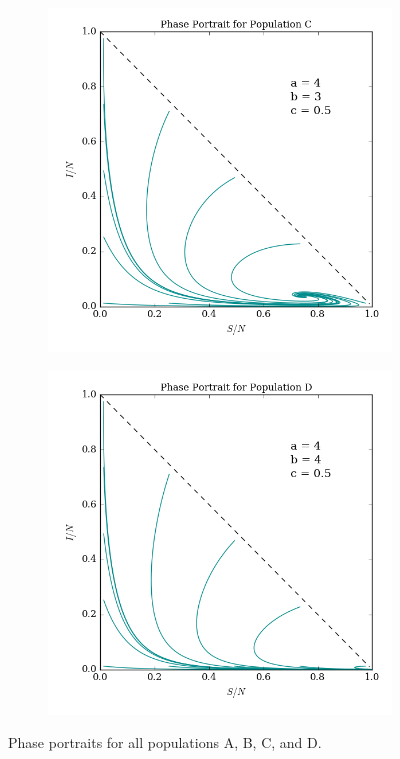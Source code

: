 \documentclass[prb,aps,twocolumn,showpacs,10pt]{revtex4-1}
\begin{document}
\begin{figure}
\medskip
\centering
\begin{subfigure}{.5\textwidth}
  \centering
  \includegraphics[width=\linewidth]{phaseportrait_C.png}
  \label{fig:sub1}
\end{subfigure}%
\begin{subfigure}{.5\textwidth}
  \centering
  \includegraphics[width=\linewidth]{phaseportrait_D.png}
  \label{fig:sub2}
\end{subfigure}
\label{fig:test}
\caption{Phase portraits for all populations A, B, C, and D.}
\end{figure}
\end{document}
